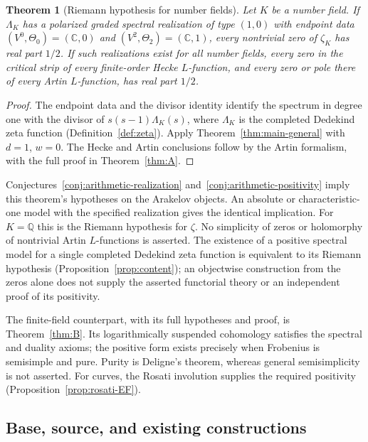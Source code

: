 \documentclass[11pt]{amsart}
\theoremstyle{plain}
\newtheorem{theorem}{Theorem}[section]
\theoremstyle{definition}
\theoremstyle{remark}
\numberwithin{equation}{section}
\newcommand{\C}{\mathbb{C}}
\newcommand{\Q}{\mathbb{Q}}
\begin{document}
\begin{theorem}[Riemann hypothesis for number fields]
\label{thm:main-number-fields}
Let $K$ be a number field. If $\Lambda_K$ has a polarized graded
spectral realization of type $(1,0)$ with endpoint data
$(V^0,\Theta_0)=(\C,0)$ and $(V^2,\Theta_2)=(\C,1)$, every
nontrivial zero of $\zeta_K$ has real part $1/2$.
If such realizations exist for all number fields,
every zero in the critical strip of every finite-order Hecke
$L$-function, and every zero or pole there of every Artin
$L$-function, has real part $1/2$.

\end{theorem}

\begin{proof}
The endpoint data and the divisor identity identify the spectrum in
degree one with the divisor of $s(s-1)\Lambda_K(s)$, where
$\Lambda_K$ is the completed Dedekind zeta function
(Definition~\ref{def:zeta}). Apply Theorem~\ref{thm:main-general} with
$d=1$, $w=0$. The Hecke and Artin conclusions follow by the Artin
formalism, with the full proof in Theorem~\ref{thm:A}.
\end{proof}

Conjectures~\ref{conj:arithmetic-realization}
and~\ref{conj:arithmetic-positivity} imply this theorem's hypotheses
on the Arakelov objects. An absolute or characteristic-one model
with the specified realization gives the identical implication.
For $K=\Q$ this is the Riemann hypothesis for $\zeta$.
 No simplicity
of zeros or holomorphy of nontrivial Artin $L$-functions is asserted.
The existence of a positive spectral model for a single completed
Dedekind zeta function is equivalent to its Riemann hypothesis
(Proposition~\ref{prop:content}); an objectwise construction
from the zeros alone does not supply the asserted functorial theory
or an independent proof of its positivity.

The finite-field counterpart, with its full hypotheses and proof, is
Theorem~\ref{thm:B}. Its logarithmically suspended cohomology satisfies
the spectral and duality axioms; the positive form exists precisely
when Frobenius is semisimple and pure. Purity is Deligne's theorem,
whereas general semisimplicity is not asserted. For curves, the Rosati
involution supplies the required positivity
(Proposition~\ref{prop:rosati-EF}).

\subsection{Base, source, and existing constructions}
\label{subsec:deninger-structures}
\end{document}
